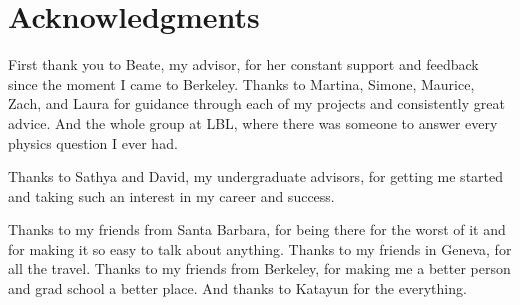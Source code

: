 

\bigskip


\begingroup

\let\clearpage\relax
\let\cleardoublepage\relax
\let\cleardoublepage\relax

\chapter*{Acknowledgments}

\noindent First thank you to Beate, my advisor, for her constant support and feedback since the moment I came to Berkeley. Thanks to Martina, Simone, Maurice, Zach, and Laura for guidance through each of my projects and consistently great advice. And the whole group at LBL, where there was someone to answer every physics question I ever had. \\ \smallskip

\noindent Thanks to Sathya and David, my undergraduate advisors, for getting me started and taking such an interest in my career and success. \\ \smallskip

\noindent Thanks to my friends from Santa Barbara, for being there for the worst of it and for making it so easy to talk about anything. Thanks to my friends in Geneva, for all the travel. Thanks to my friends from Berkeley, for making me a better person and grad school a better place. And thanks to Katayun for the everything.

\endgroup
